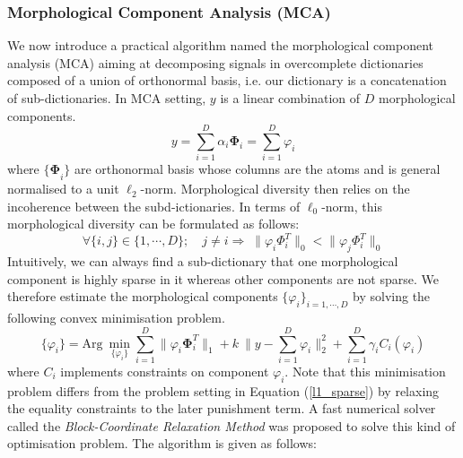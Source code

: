 \subsubsection{Morphological Component Analysis (MCA)}
We now introduce a practical algorithm named the morphological component analysis (MCA) aiming at decomposing signals in overcomplete dictionaries composed of a union of orthonormal basis, i.e. our dictionary is a concatenation of sub-dictionaries. In MCA setting, $y$ is a linear combination of $D$ morphological components. 
\begin{equation}
    y = \sum_{i=1}^D  \alpha_i \mathbf{\Phi}_i = \sum_{i=1}^D \varphi_i
    \label{Eq_dictionary}
\end{equation}
where $\mathbf{\{\Phi}_i\}$ are orthonormal basis whose columns are the atoms and is general normalised to a unit $\ell_2$-norm. Morphological diversity then relies on the incoherence between the subd-ictionaries. In terms of $\ell_0$-norm, this morphological diversity can be formulated as follows:
\begin{equation}
    \forall\{i,j\} \in \{1,\cdots,D\};\quad j \neq i \Rightarrow \; \lVert \varphi_i \Phi_i^T \rVert_0 < \lVert \varphi_j \Phi_i^T \rVert_0
\end{equation}
Intuitively, we can always find a sub-dictionary that one morphological component is highly sparse in it whereas other components are not sparse. We therefore estimate the morphological components $\{\varphi_i\}_{i=1,\cdots,D}$ by solving the following convex minimisation problem.
\begin{equation}
    \{\varphi_i\} = \text{Arg} \: \min_{\{\varphi_i\}}\sum_{i=1}^D \lVert\varphi_i \mathbf{\Phi}_i^T \rVert_{1} + k \:\lVert y-\sum_{i=1}^D\varphi_i \rVert^2_2 +  \sum_{i=1}^D \gamma_i C_i (\varphi_i)
    \label{MCAequation}
\end{equation}
where $C_i$ implements constraints on component $\varphi_i$. Note that this minimisation problem differs from the problem setting in Equation (\ref{l1_sparse}) by relaxing the equality constraints to the later punishment term. A fast numerical solver called the \textit{Block-Coordinate Relaxation Method} \cite{BlockCoordinateMethod} was proposed to solve this kind of optimisation problem. 
The algorithm is given as follows:

